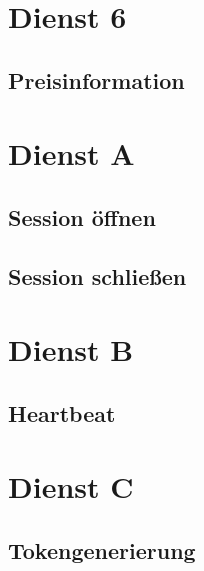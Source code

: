 \section{Dienst 6}
\label{sec:Nachrichten:Dienst6}

\subsection*{Preisinformation}
\label{subsec:Nachrichten:Dienst6:PriceInformation}





\section{Dienst A}
\label{sec:Nachrichten:DienstA}

\subsection*{Session öffnen}
\label{subsec:Nachrichten:DienstA:OpenSession}





\subsection*{Session schließen}
\label{subsec:Nachrichten:DienstA:CloseSession}





\section{Dienst B}
\label{sec:Nachrichten:DienstB}

\subsection*{Heartbeat}
\label{subsec:Nachrichten:DienstB:HeartBeat}





\section{Dienst C}
\label{sec:Nachrichten:DienstC}

\subsection*{Tokengenerierung}
\label{subsec:Nachrichten:DienstC:Tokengenerierung}




